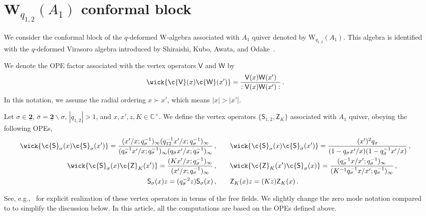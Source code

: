 \section{W$_{q_{1,2}}(A_1)$ conformal block}

We consider the conformal block of the $q$-deformed W-algebra associated with $A_1$ quiver denoted by W$_{q_{1,2}}(A_1)$.
This algebra is identified with the $q$-deformed Virasoro algebra introduced by Shiraishi, Kubo, Awata, and Odake~\cite{Shiraishi:1995rp}.

We denote the OPE factor associated with the vertex operators $\mathsf{V}$ and $\mathsf{W}$ by
\begin{align}
    \wick{ \c{\mathsf{V}}(x) \c{\mathsf{W}}(x') } = \frac{\mathsf{V}(x) \mathsf{W}(x')}{: \mathsf{V}(x) \mathsf{W}(x') :} \, .
\end{align}
In this notation, we assume the radial ordering $x \succ x'$, which means $|x| > |x'|$.


\begin{definition}\label{def:OPEs}
    Let $\sigma \in \underline{\textbf{2}}$, $\bar\sigma = \underline{\textbf{2}} \backslash \sigma$, $|q_{1,2}| > 1$, and $x, x', z, K \in \mathbb{C}^\times$.
    We define the vertex operators $\{\mathsf{S}_{1,2}, \mathsf{Z}_K\}$ associated with $A_1$ quiver, obeying the following OPEs,
    \begin{subequations}\label{eq:OPE}
    \begin{align}
        \wick{ \c {\mathsf{S}}_\sigma(x) \c {\mathsf{S}}_\sigma(x') } = \frac{(x'/x;q_\sigma^{-1})_\infty (q_{12}^{-1} x'/x;q_\sigma^{-1})_\infty}{(q_\sigma^{-1} x'/x;q_\sigma^{-1})_\infty (q_{\bar{\sigma}} x'/x;q_\sigma^{-1})_\infty}
        \, , \qquad &
        \wick{ \c {\mathsf{S}}_\sigma(x) \c {\mathsf{S}}_{\bar{\sigma}}(x') } = \frac{(x')^2 q_\sigma}{(1 - q_\sigma x'/x)(1 - q_{\bar{\sigma}}^{-1} x'/x)}
        \, , \\
        \wick{ \c {\mathsf{S}}_\sigma(x) \c {\mathsf{Z}}_K(x') } = \frac{(K x'/x;q_\sigma^{-1})_\infty}{(x'/x;q_\sigma^{-1})_\infty}
        \, , \qquad &
        \wick{ \c {\mathsf{Z}}_K(x') \c {\mathsf{S}}_\sigma(x) } = \frac{(q_\sigma^{-1} x/x';q_\sigma^{-1})_\infty}{(K^{-1} q_\sigma^{-1}x/x';q_\sigma^{-1})_\infty} 
        \, , \\
        \mathsf{S}_\sigma(x) z = (q_{\bar{\sigma}}^{-2} z) \mathsf{S}_\sigma(x)
        \, ,  \qquad &
        \mathsf{Z}_K(x) z = (K z) \mathsf{Z}_K(x)
        \, .
        \label{eq:OPE_z}
    \end{align}
    \end{subequations}
\end{definition}
See, e.g.,~\cite{Kimura:2015rgi} for explicit realization of these vertex operators in terms of the free fields.
We slightly change the zero mode notation compared to \cite{Kimura:2015rgi} to simplify the discussion below.
In this article, all the computations are based on the OPEs defined above.


